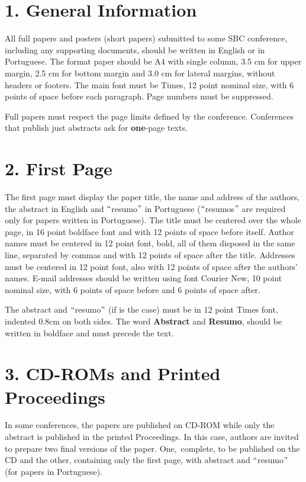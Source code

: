 \documentclass[12pt]{article}
\begin{document}
\section*{1. General Information}
All full papers and posters (short papers) submitted to some SBC conference, including any supporting documents, should be written in English or in Portuguese. The format paper should be A4 with single column, 3.5 cm for upper margin, 2.5 cm for bottom margin and 3.0 cm for lateral margins, without headers or footers. The main font must be Times, 12 point nominal size, with 6 points of space before each paragraph. Page numbers must be suppressed. \par

\tab Full papers must respect the page limits defined by the conference. Conferences that publish just abstracts ask for \textbf{one}-page texts.\par

\section*{2. First Page}
The first page must display the paper title, the name and address of the authors, the abstract in English and $``$resumo$"$  in Portuguese ($``$resumos$"$  are required only for papers written in Portuguese). The title must be centered over the whole page, in 16 point boldface font and with 12 points of space before itself. Author names must be centered in 12 point font, bold, all of them disposed in the same line, separated by commas and with 12 points of space after the title. Addresses must be centered in 12 point font, also with 12 points of space after the authors’ names. E-mail addresses should be written using font Courier New, 10 point nominal size, with 6 points of space before and 6 points of space after.\par

\tab The abstract and $``$resumo$"$  (if is the case) must be in 12 point Times font, indented 0.8cm on both sides. The word \textbf{Abstract }and \textbf{Resumo}, should be written in boldface and must precede the text.\par

\section*{3. CD-ROMs and Printed Proceedings}
In some conferences, the papers are published on CD-ROM while only the abstract is published in the printed Proceedings. In this case, authors are invited to prepare two final versions of the paper. One,\ complete, to be published on the CD and the other, containing only the first page, with abstract and $``$resumo$"$  (for papers in Portuguese).  \par
\end{document}
